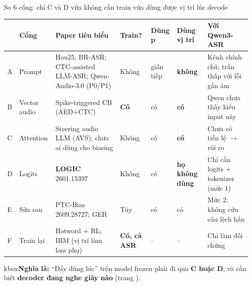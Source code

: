 \documentclass[aspectratio=169,xcolor=table]{beamer}
\newcommand{\bad}[1]{\textcolor{RiskRed}{\textbf{#1}}}
\newcommand{\good}[1]{\textcolor{GoodGreen}{\textbf{#1}}}
\newcommand{\ra}{$\rightarrow$}
\newcommand{\bsz}{\footnotesize}%
\newcommand{\nghiala}[1]{\begin{beamercolorbox}[sep=0.32em,rounded=true]{kbox}\bsz\textbf{Nghĩa là:} #1\end{beamercolorbox}}
\begin{document}
\begin{frame}{So 6 cổng: chỉ C và D vừa không cần train vừa dùng được vị trí lúc decode}
\renewcommand{\arraystretch}{1.05}\setlength{\tabcolsep}{3.5pt}\scriptsize
\begin{tabular}{C{0.3cm}L{1.6cm}L{4.2cm}C{1.3cm}C{1.0cm}C{1.3cm}L{3.3cm}}
\toprule
 & Cổng & Paper tiêu biểu & Train? & Dùng p & Dùng vị trí & Với Qwen3-ASR \\
\midrule
A & Prompt & Hou25; BR-ASR; CTC-assisted LLM-ASR; Qwen-Audio-3.0 (P0/P1) & Không & gián tiếp & \bad{không} & Kênh chính chủ; trần thấp với lỗi gần âm \\
B & Vector audio & Spike-triggered CB (AED+CTC) & \bad{Có} & có & \good{có} & Qwen chưa thấy kiểu input này \\
 C & Attention & Steering audio LLM (AVS); chưa ai dùng cho biasing & Không & có & \good{có} & Chưa có tiền lệ \ra{} rủi ro \\
 D & Logits & \textbf{LOGIC} 2601.15397 & Không & có & \bad{họ không dùng} & Chỉ cần logits + tokenizer (mức 1) \\
E & Sửa sau & PTC-Bias 2609.28727; GER & Tùy & có & có & Mức 2; không cứu câu lệch hẳn \\
F & Train lại & Hotword + RL; IBM (vị trí làm loss phụ) & \bad{Có, cả ASR} & -- & -- & Chỉ làm đối chứng \\
\bottomrule
\end{tabular}
\vspace{0.15cm}

\nghiala{``Đẩy đúng lúc'' trên model frozen phải đi qua \textbf{C hoặc D}, và cần biết \textbf{decoder đang nghe giây nào} (trang \pageref{fr:decpos}).}\end{frame}
\end{document}
